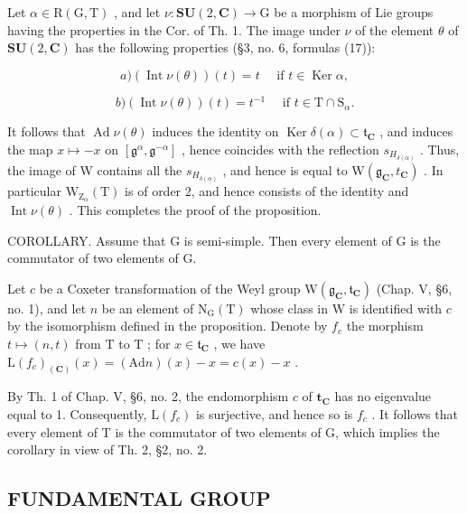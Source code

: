 Let \(\alpha \in \mathrm{R}(\mathrm{G},\mathrm{T})\) , and let \(\nu : \mathbf{SU}(2,\mathbf{C}) \to \mathrm{G}\) be a morphism of Lie groups having the properties in the Cor. of Th. 1. The image under \(\nu\) of the element \(\theta\) of \(\mathbf{SU}(2,\mathbf{C})\) has the following properties (§3, no. 6, formulas (17)):

\[
a) (\operatorname{Int} \nu (\theta)) (t) = t \quad \text { if } t \in \operatorname{Ker} \alpha ,
\]

\[
b) (\operatorname{Int} \nu (\theta)) (t) = t ^ {- 1} \quad \text { if } t \in \mathrm{T} \cap \mathrm{S} _ {\alpha}.
\]

It follows that \(\operatorname{Ad}\nu(\theta)\) induces the identity on \(\operatorname{Ker}\delta(\alpha)\subset\mathfrak{t}_{\mathbf{C}}\) , and induces the map \(x\mapsto-x\) on \([\mathfrak{g}^{\alpha},\mathfrak{g}^{-\alpha}]\) , hence coincides with the reflection \(s_{H_{\delta(\alpha)}}\) . Thus, the image of W contains all the \(s_{H_{\delta(\alpha)}}\) , and hence is equal to \(\mathrm{W}(\mathfrak{g}_{\mathbf{C}}, t_{\mathbf{C}})\) . In particular \(\mathrm{W}_{\mathrm{Z}_{\alpha}}(\mathrm{T})\) is of order 2, and hence consists of the identity and \(\operatorname{Int}\nu(\theta)\) . This completes the proof of the proposition.

COROLLARY. Assume that G is semi-simple. Then every element of G is the commutator of two elements of G.

Let \(c\) be a Coxeter transformation of the Weyl group \(\mathrm{W}(\mathfrak{g}_{\mathbf{C}},\mathfrak{t}_{\mathbf{C}})\) (Chap. V, §6, no. 1), and let \(n\) be an element of \(\mathrm{N}_{\mathrm{G}}(\mathrm{T})\) whose class in \(\mathrm{W}\) is identified with \(c\) by the isomorphism defined in the proposition. Denote by \(f_{c}\) the morphism \(t\mapsto (n,t)\) from \(\mathrm{T}\) to \(\mathrm{T}\) ; for \(x\in \mathfrak{t}_{\mathbf{C}}\) , we have \(\mathrm{L}(f_c)_{(\mathbf{C})}(x) = (\mathrm{Ad}n)(x) - x = c(x) - x\) .

By Th. 1 of Chap. V, §6, no. 2, the endomorphism \(c\) of \(\mathbf{t}_{\mathbf{C}}\) has no eigenvalue equal to 1. Consequently, \(\mathrm{L}(f_c)\) is surjective, and hence so is \(f_c\) . It follows that every element of T is the commutator of two elements of G, which implies the corollary in view of Th. 2, §2, no. 2.

\subsection{FUNDAMENTAL GROUP}

